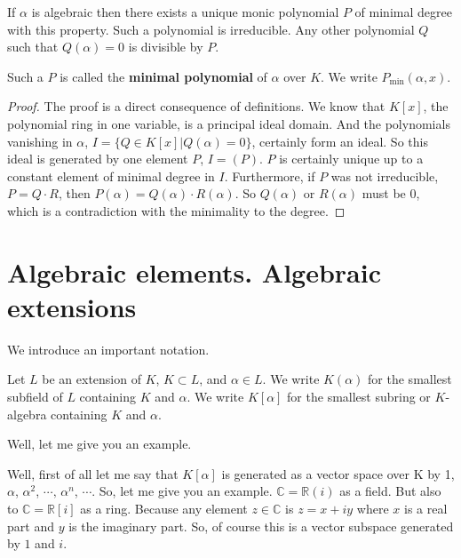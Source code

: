 \begin{lemma} If $\alpha$ is algebraic then there exists a unique monic polynomial $P$ of minimal degree with this property. Such a polynomial is irreducible. Any other polynomial $Q$ such that $Q(\alpha)=0$ is divisible by $P$.
\end{lemma}
\begin{definition}
Such a $P$ is called the \textbf{minimal polynomial} of $\alpha$ over $K$. We write $P_{\text{min}}(\alpha,x)$.
\end{definition}

\begin{proof}
The proof is a direct consequence of definitions. We know that $K[x]$, the polynomial ring in one variable, is a principal ideal domain. And the polynomials vanishing in $\alpha$, $I=\{Q\in K[x]|Q(\alpha)=0\}$, certainly form an ideal. So this ideal is generated by one element $P$, $I=(P)$. $P$ is certainly unique up to a constant element of minimal degree in $I$. Furthermore, if $P$ was not irreducible, $P=Q\cdot R$, then $P(\alpha) = Q(\alpha) \cdot R(\alpha)$. So $Q(\alpha)$ or $R(\alpha)$ must be 0, which is a contradiction with the minimality to the degree. 
\end{proof}

\section{Algebraic elements. Algebraic extensions}

We introduce an important notation. 
\begin{definition}
Let $L$ be an extension of $K$, $K\subset L$, and $\alpha\in L$. We write $K(\alpha)$ for the smallest subfield of $L$ containing $K$ and $\alpha$. We write $K[\alpha]$ for the smallest subring or $K$-algebra containing $K$ and $\alpha$. 
\end{definition}

Well, let me give you an example. 
\begin{example}
Well, first of all let me say that $K[\alpha]$ is generated as a vector space over K by 1, $\alpha$, $\alpha^2$, $\cdots\text{, }\alpha^n$, $\cdots$. So, let me give you an example. $\mathbb{C} = \mathbb{R}(i)$ as a field. But also to $\mathbb{C} = \mathbb{R}[i]$ as a ring. Because any element $z\in\mathbb{C}$ is $z=x + iy$ where $x$ is a real part and $y$ is the imaginary part. So, of course this is a vector subspace generated by $1$ and $i$. 
\end{example}

